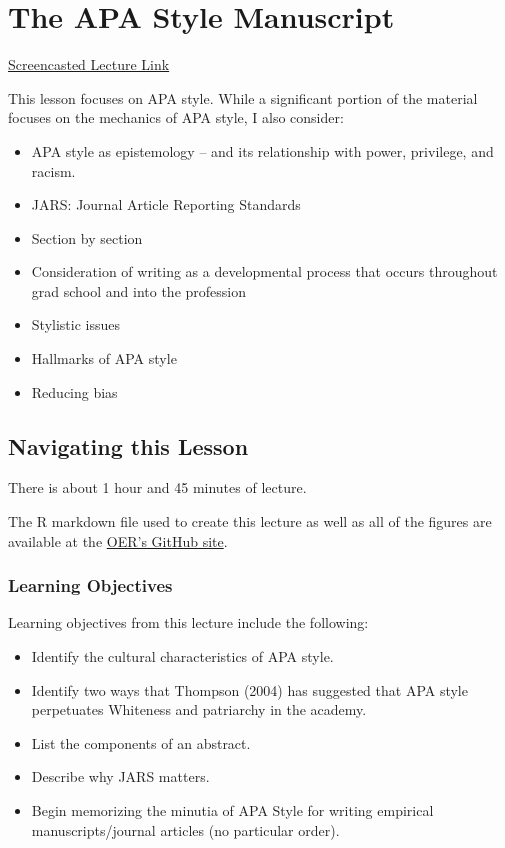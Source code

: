 \documentclass[
  11pt,
]{book}
\providecommand{\tightlist}{%
  \setlength{\itemsep}{0pt}\setlength{\parskip}{0pt}}
\begin{document}
\hypertarget{APAstyle}{%
\chapter{The APA Style Manuscript}\label{APAstyle}}

\href{https://spu.hosted.panopto.com/Panopto/Pages/Viewer.aspx?pid=8ca9d96d-0ff6-4068-a570-ac290189a4d4}{Screencasted Lecture Link}

This lesson focuses on APA style. While a significant portion of the material focuses on the mechanics of APA style, I also consider:

\begin{itemize}
\tightlist
\item
  APA style as epistemology -- and its relationship with power, privilege, and racism.
\item
  JARS: Journal Article Reporting Standards
\item
  Section by section
\item
  Consideration of writing as a developmental process that occurs throughout grad school and into the profession
\item
  Stylistic issues
\item
  Hallmarks of APA style
\item
  Reducing bias
\end{itemize}

\hypertarget{navigating-this-lesson}{%
\section{Navigating this Lesson}\label{navigating-this-lesson}}

There is about 1 hour and 45 minutes of lecture.

The R markdown file used to create this lecture as well as all of the figures are available at the \href{https://github.com/lhbikos/ReC_Topics}{OER's GitHub site}.

\hypertarget{learning-objectives}{%
\subsection{Learning Objectives}\label{learning-objectives}}

Learning objectives from this lecture include the following:

\begin{itemize}
\tightlist
\item
  Identify the cultural characteristics of APA style.
\item
  Identify two ways that Thompson (2004) has suggested that APA style perpetuates Whiteness and patriarchy in the academy.
\item
  List the components of an abstract.
\item
  Describe why JARS matters.
\item
  Begin memorizing the minutia of APA Style for writing empirical manuscripts/journal articles (no particular order).
\end{itemize}
\end{document}
